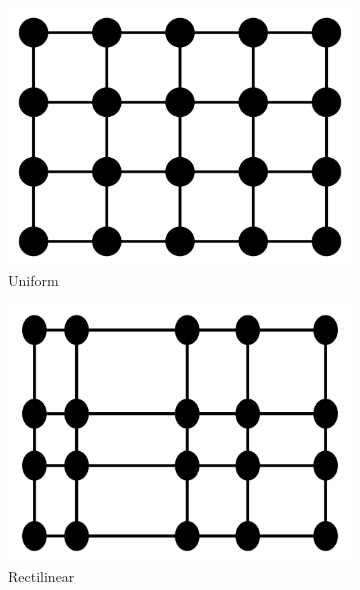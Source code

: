 \begin{figure}
\begin{subfigure}[b]{0.2\textwidth}
    \includegraphics[width=\textwidth]{Images/uniform.pdf}
    \caption{Uniform}
    \label{fig:uniform}
  \end{subfigure}
  \begin{subfigure}[b]{0.2\textwidth}
    \includegraphics[width=\textwidth]{Images/rectilinear.pdf}
    \caption{Rectilinear}
    \label{fig:rectilinear}
  \end{subfigure}
  \begin{subfigure}[b]{0.19\textwidth}

\end{subfigure}
\end{figure}
